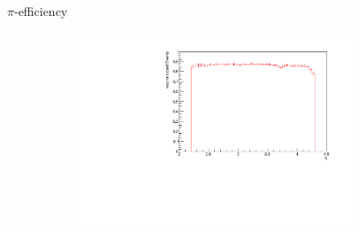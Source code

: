 \documentclass[11pt]{beamer}
\begin{document}
\begin{frame}{$\pi$-efficiency}
\begin{figure}
\begin{subfigure}{0.45\textwidth}
\end{subfigure}
\begin{subfigure}{0.45\textwidth}
\includegraphics[width=0.9\textwidth]{up_pdf/single/pos/h_eta_reco_Pi_pos.pdf}
\end{subfigure}
\end{figure}
\end{frame}
\end{document}
